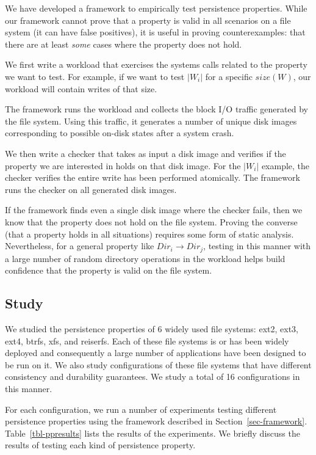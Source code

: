 We have developed a framework to empirically test persistence properties.
While our framework cannot prove that a property is valid in all scenarios on a
file system (it can have false positives), it is useful in proving
counterexamples: that there are at least \textit{some} cases where the property
does not hold.   

We first write a workload that exercises the systems calls related to the
property we want to test. For example, if we want to test $|W_i|$ for a
specific $size(W)$, our workload will contain writes of that size. 

The framework runs the workload and collects the block I/O traffic generated by
the file system. Using this traffic, it generates a number of unique disk
images corresponding to possible on-disk states after a system crash. 

We then write a checker that takes as input a disk image and verifies if the
property we are interested in holds on that disk image. For the $|W_i|$
example, the checker verifies the entire write has been performed atomically.
The framework runs the checker on all generated disk images. 

If the framework finds even a single disk image where the checker fails, then
we know that the property does not hold on the file system. Proving the
converse (that a property holds in all situations) requires some form of static
analysis. Nevertheless, for a general property like $Dir_i \to Dir_j$, testing
in this manner with a large number of random directory operations in the
workload helps build confidence that the property is valid on the file system.

\subsection{Study}
\label{sec-fs-properties}


We studied the persistence properties of 6 widely used file systems: ext2,
ext3, ext4, btrfs, xfs, and reiserfs. Each of these file systems is or has been
widely deployed and consequently a large number of applications have been
designed to be run on it. We also study configurations of these file systems
that have different consistency and durability guarantees. We study a total of
16 configurations in this manner.

For each configuration, we run a number of experiments testing different
persistence properties using the framework described in
Section~\ref{sec-framework}. Table~\ref{tbl-ppresults} lists the results of the  
experiments. We briefly discuss the results of testing each kind of persistence
property.


